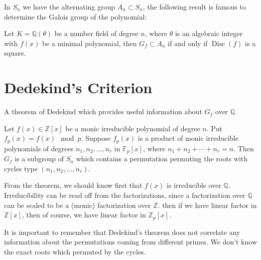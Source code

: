 In $S_n$ we have the alternating group $A_n\subset S_n$, the following result is famous to determine the Galois group of the polynomial:
\begin{theorem}\label{thm:discriminantsq}
Let $K=\mathbb{Q}(\theta)$ be a number field of degree $n$, where $\theta$ is an algebraic integer with $f(x)$ be a minimal polynomial, then $G_{f}\subset A_n$ if and only if $\operatorname{Disc}(f)$ is a square. 
\end{theorem}

\section{Dedekind's Criterion}
A theorem of Dedekind \citep{Conrad_recognizinggalois} which provides useful information about $G_f$ over $\mathbb{Q}$. 
\par

\begin{theorem}\label{thm:Dedekindcri}
Let $f(x)\in\mathbb{Z}[x]$ be a monic irreducible polynomial of degree $n$. Put $f_p(x)=f(x) \mod p$. Suppose $f_p(x)$ is a product of monic irreducible polynomials of degrees $n_1,n_2,\dots,n_r$ in $\mathbb{F}_p[x]$, where $n_1+n_2+\cdots+n_r=n$. Then $G_f$ is a subgroup of $S_n$ which contains a permutation permuting the roots with cycles type $(n_1,n_2,\dots,n_r)$.
\end{theorem}
\par

From the theorem, we should know first that $f(x)$ is irreducible over $\mathbb{Q}$. Irreducibility can be read off from the factorizations, since a factorization over $\mathbb{Q}$ can be scaled to be  a (monic) factorization over $\mathbb{Z}$. then if we have linear factor in $\mathbb{Z}[x]$, then of course, we have linear factor in $\mathbb{Z}_p[x]$.

It is important to remember that Dedekind's theorem does not correlate any information about the permutations coming from different primes. We don't know the exact roots which permuted by the cycles.


